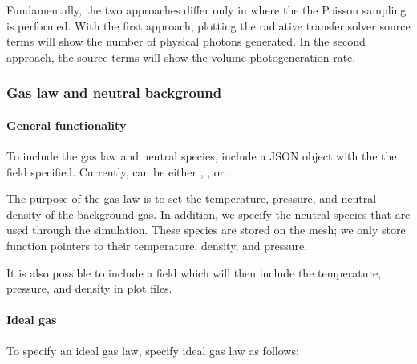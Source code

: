 \documentclass[letterpaper,10pt,english]{sphinxmanual}
\begin{document}
\sphinxAtStartPar
Fundamentally, the two approaches differ only in where the the Poisson sampling is performed.
With the first approach, plotting the radiative transfer solver source terms will show the number of physical photons generated.
In the second approach, the source terms will show the volume photo\sphinxhyphen{}generation rate.


\subsubsection{Gas law and neutral background}
\label{\detokenize{Applications/CdrPlasmaModel:gas-law-and-neutral-background}}

\paragraph{General functionality}
\label{\detokenize{Applications/CdrPlasmaModel:general-functionality}}
\sphinxAtStartPar
To include the gas law and neutral species, include a JSON object  with the the field  specified.
Currently,  can be either , , or .

\sphinxAtStartPar
The purpose of the gas law is to set the temperature, pressure, and neutral density of the background gas.
In addition, we specify the neutral species that are used through the simulation.
These species are  stored on the mesh; we only store function pointers to their temperature, density, and pressure.

\sphinxAtStartPar
It is also possible to include a field  which will then include the temperature, pressure, and density in plot files.


\paragraph{Ideal gas}
\label{\detokenize{Applications/CdrPlasmaModel:ideal-gas}}
\sphinxAtStartPar
To specify an ideal gas law, specify ideal gas law as follows:

\begin{sphinxVerbatim}[commandchars=\\\{\},formatcom=\scriptsize]
     
     
     
\end{sphinxVerbatim}
\end{document}
